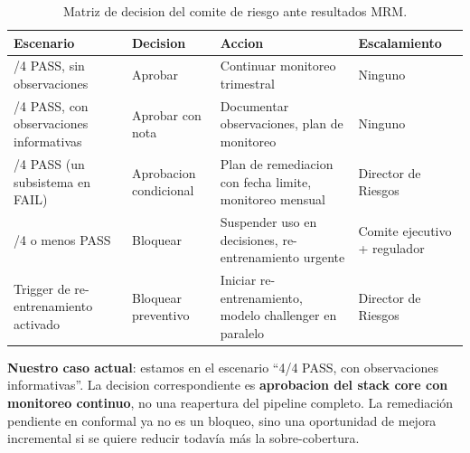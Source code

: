 \documentclass[
  spanish,
  11pt,
  letterpaper,
]{scrbook}
\theoremstyle{plain}
\theoremstyle{remark}
\begin{document}
{

\begin{longtable}[]{@{}
  >{\raggedright\arraybackslash}p{}
  >{\raggedright\arraybackslash}p{}
  >{\raggedright\arraybackslash}p{}
  >{\raggedright\arraybackslash}p{}@{}}

\caption{\label{tbl-mrm-decision-matrix}Matriz de decision del comite de
riesgo ante resultados MRM.}

\tabularnewline

\toprule\noalign{}
\begin{minipage}[b]{\linewidth}\raggedright
Escenario
\end{minipage} & \begin{minipage}[b]{\linewidth}\raggedright
Decision
\end{minipage} & \begin{minipage}[b]{\linewidth}\raggedright
Accion
\end{minipage} & \begin{minipage}[b]{\linewidth}\raggedright
Escalamiento
\end{minipage} \\
\midrule\noalign{}
\endhead
\bottomrule\noalign{}
\endlastfoot
4/4 PASS, sin observaciones & Aprobar & Continuar monitoreo trimestral &
Ninguno \\
4/4 PASS, con observaciones informativas & Aprobar con nota & Documentar
observaciones, plan de monitoreo & Ninguno \\
3/4 PASS (un subsistema en FAIL) & Aprobacion condicional & Plan de
remediacion con fecha limite, monitoreo mensual & Director de Riesgos \\
2/4 o menos PASS & Bloquear & Suspender uso en decisiones,
re-entrenamiento urgente & Comite ejecutivo + regulador \\
Trigger de re-entrenamiento activado & Bloquear preventivo & Iniciar
re-entrenamiento, modelo challenger en paralelo & Director de Riesgos \\

\end{longtable}

}

\textbf{Nuestro caso actual}: estamos en el escenario ``4/4 PASS, con
observaciones informativas''. La decision correspondiente es
\textbf{aprobacion del stack core con monitoreo continuo}, no una
reapertura del pipeline completo. La remediación pendiente en conformal
ya no es un bloqueo, sino una oportunidad de mejora incremental si se
quiere reducir todavía más la sobre-cobertura.
\end{document}
